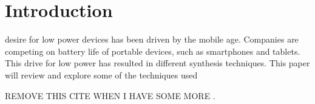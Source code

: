 

\section{Introduction}
 desire for low power devices has been driven by the mobile age.
Companies are competing on battery life of portable devices, such as smartphones and tablets.
This drive for low power has resulted in different synthesis techniques.
This paper will review and explore some of the techniques used 

REMOVE THIS CITE WHEN I HAVE SOME MORE \cite{chandrakasan1992low}.


